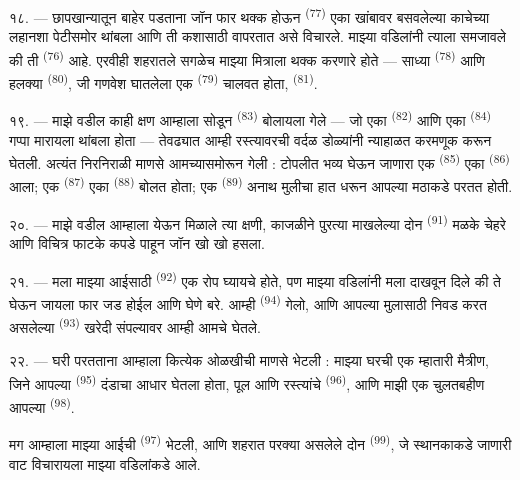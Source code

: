 \VUsaut{3.0mm}

१८. --- छापखान्यातून बाहेर पडताना जॉन फार थक्क होऊन 
\textsuperscript{(77)} एका खांबावर बसवलेल्या काचेच्या लहानशा पेटीसमोर थांबला आणि ती कशासाठी
वापरतात असे विचारले. माझ्या वडिलांनी त्याला समजावले की ती 
\textsuperscript{(76)} आहे. एरवीही शहरातले सगळेच माझ्या मित्राला थक्क करणारे होते — साध्या
 \textsuperscript{(78)} आणि हलक्या 
\textsuperscript{(80)}, जी गणवेश घातलेला एक  \textsuperscript{(79)} चालवत होता,
 \textsuperscript{(81)}.

१९. --- माझे वडील काही क्षण आम्हाला सोडून  \textsuperscript{(83)}
बोलायला गेले — जो एका  \textsuperscript{(82)} आणि एका 
\textsuperscript{(84)} गप्पा मारायला थांबला होता — तेवढ्यात आम्ही रस्त्यावरची वर्दळ डोळ्यांनी
न्याहाळत करमणूक करून घेतली. अत्यंत निरनिराळी माणसे आमच्यासमोरून गेली : टोपलीत भव्य
 घेऊन जाणारा एक  \textsuperscript{(85)} एका
 \textsuperscript{(86)} आला; एक 
\textsuperscript{(87)} एका  \textsuperscript{(88)} बोलत होता; एक
 \textsuperscript{(89)} अनाथ मुलीचा हात धरून आपल्या मठाकडे परतत होती.

\VUsaut{3.0mm}

२०. --- माझे वडील आम्हाला येऊन मिळाले त्या क्षणी, काजळीने पुरत्या माखलेल्या दोन
 \textsuperscript{(91)} मळके चेहरे आणि विचित्र फाटके कपडे पाहून
जॉन खो खो हसला.

२१. --- मला माझ्या आईसाठी  \textsuperscript{(92)} एक रोप घ्यायचे होते, पण
माझ्या वडिलांनी मला दाखवून दिले की ते घेऊन जायला फार जड होईल आणि  घेणे बरे.
आम्ही  \textsuperscript{(94)} गेलो, आणि आपल्या मुलासाठी निवड करत
असलेल्या  \textsuperscript{(93)} खरेदी संपल्यावर आम्ही आमचे घेतले.

२२. --- घरी परतताना आम्हाला कित्येक ओळखीची माणसे भेटली : माझ्या घरची एक म्हातारी मैत्रीण, जिने
आपल्या  \textsuperscript{(95)} दंडाचा आधार घेतला होता, पूल आणि रस्त्यांचे
 \textsuperscript{(96)}, आणि माझी एक चुलतबहीण आपल्या 
\textsuperscript{(98)}.

मग आम्हाला माझ्या आईची  \textsuperscript{(97)} भेटली, आणि शहरात परक्या
असलेले दोन  \textsuperscript{(99)}, जे स्थानकाकडे जाणारी वाट विचारायला माझ्या
वडिलांकडे आले.

\VUsaut{6.0mm}
\VUfilet{22mm}

